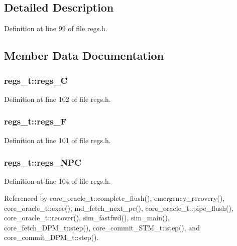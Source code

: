 \subsection{Detailed Description}


Definition at line 99 of file regs.h.

\subsection{Member Data Documentation}
\subsubsection[{regs\_\-C}]{ {\bf regs\_\-t::regs\_\-C}}\label{structregs__t_08bd9de629360f171b32e08c4106b46f}




Definition at line 102 of file regs.h.
\subsubsection[{regs\_\-F}]{ {\bf regs\_\-t::regs\_\-F}}\label{structregs__t_199e4c2554e7b45f974cf6ecd51853ec}




Definition at line 101 of file regs.h.
\subsubsection[{regs\_\-NPC}]{ {\bf regs\_\-t::regs\_\-NPC}}\label{structregs__t_70500e5215c4ebb383c43c05a670346c}




Definition at line 104 of file regs.h.

Referenced by core\_\-oracle\_\-t::complete\_\-flush(), emergency\_\-recovery(), core\_\-oracle\_\-t::exec(), md\_\-fetch\_\-next\_\-pc(), core\_\-oracle\_\-t::pipe\_\-flush(), core\_\-oracle\_\-t::recover(), sim\_\-fastfwd(), sim\_\-main(), core\_\-fetch\_\-DPM\_\-t::step(), core\_\-commit\_\-STM\_\-t::step(), and core\_\-commit\_\-DPM\_\-t::step().
